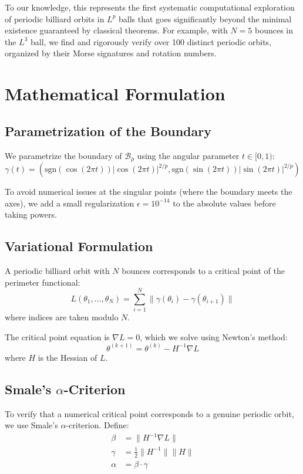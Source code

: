 \documentclass[11pt]{amsart}
\theoremstyle{plain}
\theoremstyle{definition}
\theoremstyle{remark}
\begin{document}
To our knowledge, this represents the first systematic computational exploration of periodic billiard orbits in $L^p$ balls that goes significantly beyond the minimal existence guaranteed by classical theorems. For example, with $N=5$ bounces in the $L^3$ ball, we find and rigorously verify over 100 distinct periodic orbits, organized by their Morse signatures and rotation numbers.

\section{Mathematical Formulation}

\subsection{Parametrization of the Boundary}

We parametrize the boundary of $\mathcal{B}_p$ using the angular parameter $t \in [0,1)$:
\[
\gamma(t) = \left(\text{sgn}(\cos(2\pi t))|\cos(2\pi t)|^{2/p}, 
\text{sgn}(\sin(2\pi t))|\sin(2\pi t)|^{2/p}\right)
\]

To avoid numerical issues at the singular points (where the boundary meets the axes), we add a small regularization $\epsilon = 10^{-14}$ to the absolute values before taking powers.

\subsection{Variational Formulation}

A periodic billiard orbit with $N$ bounces corresponds to a critical point of the perimeter functional:
\[
L(\theta_1, \ldots, \theta_N) = \sum_{i=1}^N \|\gamma(\theta_i) - \gamma(\theta_{i+1})\|
\]
where indices are taken modulo $N$.

The critical point equation is $\nabla L = 0$, which we solve using Newton's method:
\[
\theta^{(k+1)} = \theta^{(k)} - H^{-1}\nabla L
\]
where $H$ is the Hessian of $L$.

\subsection{Smale's \texorpdfstring{$\alpha$}{alpha}-Criterion}

To verify that a numerical critical point corresponds to a genuine periodic orbit, we use Smale's $\alpha$-criterion. Define:
\begin{align}
\beta &= \|H^{-1}\nabla L\| \\
\gamma &= \frac{1}{2}\|H^{-1}\|\|H\| \\
\alpha &= \beta \cdot \gamma
\end{align}
\end{document}

